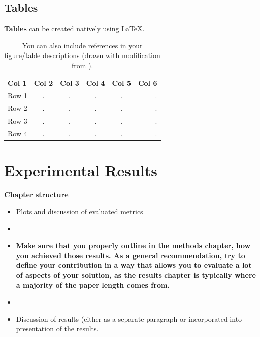 \documentclass[conference]{IEEEtran}
\begin{document}
\subsection{Tables}
\textbf{Tables} can be created natively using LaTeX.

\begin{table}[!h]
    \centering
    \setlength{\tabcolsep}{0.5em} %
    {\renewcommand{\arraystretch}{1.2}%
    \begin{tabular}{|l|c|c|c|c|r|}
        \hline
        \textbf{Col 1} & \textbf{Col 2} & \textbf{Col 3} & \textbf{Col 4} & \textbf{Col 5} & \textbf{Col 6} \\ \hline
        Row 1 & . & . & . & . & . \\ \hline
        Row 2 & . & . & . & . & . \\ \hline
        Row 3 & . & . & . & . & . \\ \hline
        Row 4 & . & . & . & . & . \\ \hline
    \end{tabular}}
    \caption{You can also include references in your figure/table descriptions (drawn with modification from \protect\cite{Bishop2006Pattern}).}
    \label{tab:leereTabelle}
\end{table}

\color{blindtext}\blindtext\blindtext\color{black}

\section{Experimental Results}

\color{structure}
\textbf{Chapter structure}
\begin{itemize}
    \item Plots and discussion of evaluated metrics
    \item[]
    
    \item[$\to$] \textbf{Make sure that you properly outline in the methods chapter, how you achieved those results. As a general recommendation, try to define your contribution in a way that allows you to evaluate a lot of aspects of your solution, as the results chapter is typically where a majority of the paper length comes from.}
    \item[]
    
    \item Discussion of results (either as a separate paragraph or incorporated into presentation of the results.
\end{itemize}
\color{black}
\end{document}
